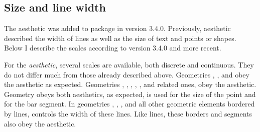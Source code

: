 \documentclass[krantz2]{krantz}\usepackage{knitr}
\begin{document}
\begin{knitrout}\footnotesize
{}\color{fgcolor}\begin{kframe}
\begin{alltt}
\hlstd{(} 
        \hlstd{=} \hlstd{(} \hlstd{=} \hlstd{(} \hlstd{=}     
                       \hlopt{+}
  \hlstd{(} \hlstd{=} \hlstd{,}  
\end{alltt}
\end{kframe}
\end{knitrout}


\subsection{Size and line width}
\begin{warningbox}
  The  aesthetic was added to package \ggplot in version 3.4.0. Previously, aesthetic  described the width of lines as well as the size of text and points or shapes. Below I describe the scales according to version 3.4.0 and more recent.
\end{warningbox}

For the  \emph{aesthetic}, several scales are available, both discrete and continuous. They do not differ much from those already described above. Geometries , , and  obey the  aesthetic as expected. Geometries , , , , ,  and related ones, obey the  aesthetic. Geometry  obeys both aesthetics, as expected,  is used for the size of the point and  for the bar segment. In geometries , , ,  and all other geometric elements bordered by lines,  controls the width of these lines. Like lines, these borders and segments also obey the  aesthetic.
\end{document}
